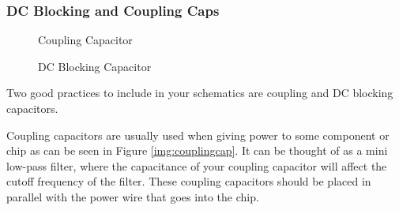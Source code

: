 \subsubsection{DC Blocking and Coupling Caps}
\begin{figure}[H]
  \begin{minipage}{0.5\textwidth}
    \centering
    \caption{Coupling Capacitor}
    \label{img:couplingcap}
  \end{minipage}
  \begin{minipage}{0.5\textwidth}
    \centering
    \caption{DC Blocking Capacitor}
    \label{img:dcblockingcap}
  \end{minipage}
\end{figure}

Two good practices to include in your schematics are coupling and DC blocking capacitors. 

Coupling capacitors are usually used when giving power to some component or chip as can be seen in Figure \ref{img:couplingcap}. It 
can be thought of as a mini low-pass filter, where the capacitance of your coupling capacitor will affect the 
cutoff frequency of the filter. These coupling capacitors should be placed in parallel with the power wire that goes into the chip.

